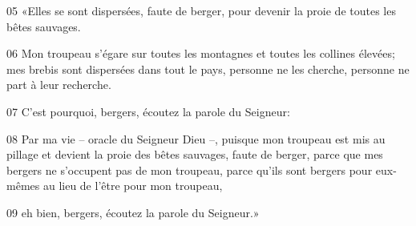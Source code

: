 
05 «Elles se sont dispersées, faute de berger, pour devenir la proie de toutes les bêtes sauvages.

06 Mon troupeau s’égare sur toutes les montagnes et toutes les collines élevées; mes brebis sont dispersées dans tout le pays, personne ne les cherche, personne ne part à leur recherche.

07 C’est pourquoi, bergers, écoutez la parole du Seigneur:

08 Par ma vie – oracle du Seigneur Dieu –, puisque mon troupeau est mis au pillage et devient la proie des bêtes sauvages, faute de berger, parce que mes bergers ne s’occupent pas de mon troupeau, parce qu’ils sont bergers pour eux-mêmes au lieu de l’être pour mon troupeau,

09 eh bien, bergers, écoutez la parole du Seigneur.»
